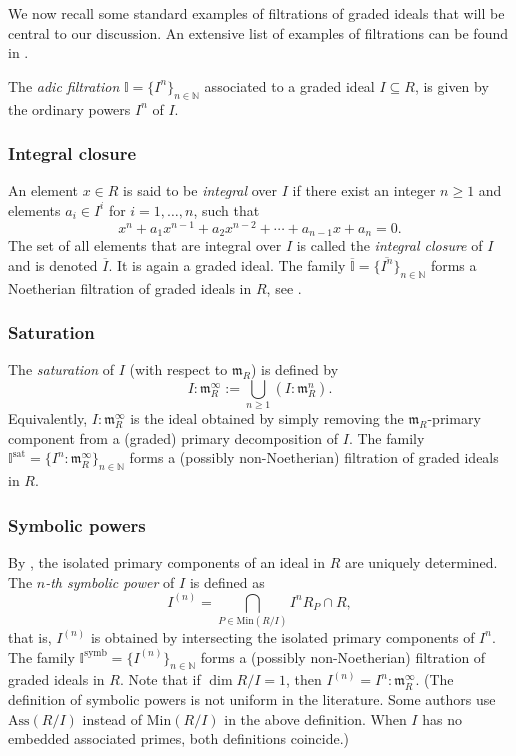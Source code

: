 \documentclass[12pt,a4paper]{amsart}
\theoremstyle{plain}
\theoremstyle{definition}
\numberwithin{equation}{theorem}
\begin{document}
We now recall some standard examples of filtrations of graded ideals that will be central to our discussion. An extensive list of examples of filtrations can be found in \cite[Example 2.4.16]{Laz04a}.

The \emph{adic filtration} $\mathbb{I} = \{I^n\}_{n\in\mathbb{N}}$ associated to a graded ideal $I\subseteq R$, is given by the ordinary powers $I^n$ of $I$.

\subsubsection{Integral closure}
An element $x\in R$ is said to be \emph{integral} over $I$ if there exist an integer $n\geq 1$ and elements $a_i\in I^i$ for $i=1,\ldots,n$, such that $$x^n+a_1x^{n-1}+a_2x^{n-2}+\cdots+a_{n-1}x + a_n =0.$$ The set of all elements that are integral over $I$ is called the \emph{integral closure} of $I$ and is denoted $\overline{I}$. It is again a graded ideal. The family $\overline{\mathbb{I}} = \{\overline{I^n}\}_{n\in\mathbb{N}}$ forms a Noetherian filtration of graded ideals in $R$, see \cite[Proposition 5.3.4]{HS06}.

\subsubsection{Saturation}
The \emph{saturation} of $I$ (with respect to $\mathfrak{m}_R$) is defined by $$I \colon \mathfrak{m}_R^{\infty} := \bigcup_{n\geq 1} \left(I \colon \mathfrak{m}_R^{n}\right).$$ Equivalently, $I \colon \mathfrak{m}_R^{\infty}$ is the ideal obtained by simply removing the $\mathfrak{m}_R$-primary component from a (graded) primary decomposition of $I$. The family $\mathbb{I}^{\mathrm{sat}} = \{I^n \colon \mathfrak{m}_R^{\infty}\}_{n\in\mathbb{N}}$ forms a (possibly non-Noetherian) filtration of graded ideals in $R$.

\subsubsection{Symbolic powers}
By \cite[Corollary 4.11]{AM69}, the isolated primary components of an ideal in $R$ are uniquely determined. The \emph{$n$-th symbolic power} of $I$ is defined as $$I^{(n)} = \bigcap_{P\in\mathrm{Min}(R/I)}I^nR_P\cap R,$$ that is, $I^{(n)}$ is obtained by intersecting the isolated primary components of $I^n$. The family $\mathbb{I}^{\mathrm{symb}} = \{I^{(n)}\}_{n\in\mathbb{N}}$ forms a (possibly non-Noetherian) filtration of graded ideals in $R$. Note that if $\dim R/I=1$, then $I^{(n)} = I^n \colon \mathfrak{m}_R^{\infty}$. (The definition of symbolic powers is not uniform in the literature. Some authors use $\mathrm{Ass}(R/I)$ instead of $\mathrm{Min}(R/I)$ in the above definition. When $I$ has no embedded associated primes, both definitions coincide.)
\end{document}
